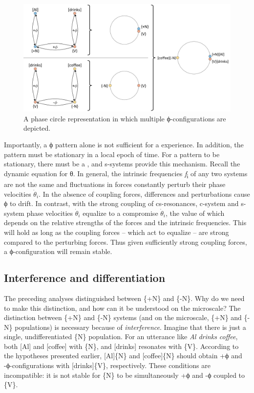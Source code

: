   
\begin{figure}
\includegraphics[width=\textwidth]{figures/Tilsen-img22.png}
\caption{A phase circle representation in which multiple ϕ-configurations are depicted.}
\label{fig:2:15}
\end{figure}
 

  Importantly, a ϕ pattern alone is not sufficient for a  experience. In addition, the pattern must be stationary in a local epoch of time. For a pattern to be stationary, there must be a , and s-systems provide this mechanism. Recall the dynamic equation for θ. In general, the intrinsic frequencies \textit{f}\textsubscript{i} of any two systems are not the same and fluctuations in  forces constantly perturb their phase velocities $\dot{\theta}_i$. In the absence of coupling forces,  differences and  perturbations cause ϕ to drift. In contrast, with the strong coupling of cs-resonances, c-system and s-system phase velocities $\dot{\theta}_i$ equalize to a compromise $\dot{\theta}_i$, the value of which depends on the relative strengths of the forces and the intrinsic frequencies. This will hold as long as the coupling forces -- which act to equalize  -- are strong compared to the perturbing forces. Thus given sufficiently strong coupling forces, a ϕ-configuration will remain stable.

\subsection{Interference and differentiation}

The preceding analyses distinguished between \{+N\} and \{-N\}. Why do we need to make this distinction, and how can it be understood on the microscale? The distinction between \{+N\} and \{-N\} systems (and on the microscale, \{+N\} and \{-N\} populations) is necessary because of \textit{interference}. Imagine that there is just a single, undifferentiated \{N\} population. For an utterance like \textit{Al drinks coffee}, both [Al] and [coffee]  with \{N\}, and [drinks] resonates with \{V\}. According to the  hypotheses presented earlier, [Al]\{N\} and [coffee]\{N\} should obtain +ϕ and -ϕ-configurations with [drinks]\{V\}, respectively. These conditions are incompatible: it is not stable for \{N\} to be simultaneously +ϕ and -ϕ coupled to \{V\}.

